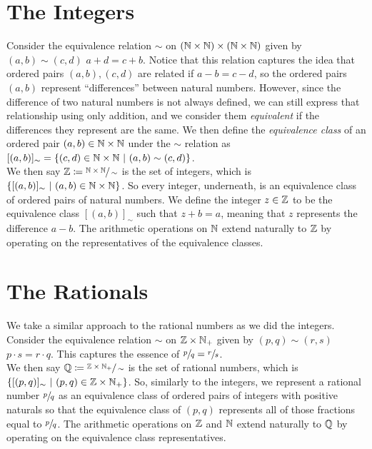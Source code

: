 \section{The Integers}
Consider the equivalence relation $\sim$ on $\pn*{\N \times \N} \times \pn*{\N \times \N}$
given by $(a, b) \sim (c, d)$ \iffbydefn $a + d = c + b$.
Notice that this relation captures the idea that ordered pairs $(a, b), (c, d)$ are related
if $a - b = c - d$, so the ordered pairs $(a, b)$ represent ``differences'' between natural numbers.
However, since the difference of two natural numbers is not always defined,
we can still express that relationship using only addition,
and we consider them \emph{equivalent} if the differences they represent are the same.
We then define the \emph{equivalence class} of an ordered pair $(a, b) \in \mathbb{N} \times \mathbb{N}$ under the $\sim$
relation as $[(a, b)]_{\sim} = \set*{(c, d) \in \N \times \N \suchthat (a, b) \sim (c, d)}$.\\
We then say $\mathbb{Z} \coloneqq \sfrac{\mathbb{N} \times \mathbb{N}}{\sim}$ is the set of integers,
which is $\set*{[(a, b)]_{\sim} \suchthat (a, b) \in \N \times \N}$.
So every integer, underneath, is an equivalence class of ordered pairs of natural numbers.
We define the integer $z \in \mathbb{Z}$ to be the equivalence class $[(a, b)]_{\sim}$ such that $z + b = a$,
meaning that $z$ represents the difference $a - b$.
The arithmetic operations on $\mathbb{N}$ extend naturally to $\mathbb{Z}$
by operating on the representatives of the equivalence classes.

\section{The Rationals}
We take a similar approach to the rational numbers as we did the integers.
Consider the equivalence relation $\sim$ on $\mathbb{Z} \times \mathbb{N}_+$
given by $(p, q) \sim (r, s)$ \iffbydefn $p \cdot s = r \cdot q$.
This captures the essence of $\sfrac{p}{q} = \sfrac{r}{s}$.\\
We then say $\mathbb{Q} \coloneqq \sfrac{\mathbb{Z} \times \mathbb{N}_+}{\sim}$ is the set of rational numbers,
which is $\set*{[(p, q)]_{\sim} \suchthat (p, q) \in \Z \times \N_+}$.
So, similarly to the integers,
we represent a rational number $\sfrac{p}{q}$
as an equivalence class of ordered pairs of integers with positive naturals
so that the equivalence class of $(p, q)$ represents all of those fractions equal to $\sfrac{p}{q}$.
The arithmetic operations on $\mathbb{Z}$ and $\mathbb{N}$ extend naturally to $\mathbb{Q}$
by operating on the equivalence class representatives.

